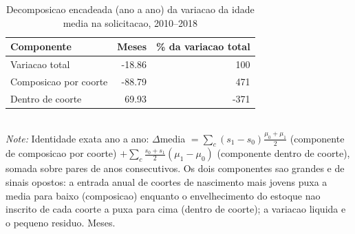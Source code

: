 \begin{table}[htbp]\centering
\caption{Decomposicao encadeada (ano a ano) da variacao da idade media na solicitacao, 2010--2018}
\label{tab:R3c_shiftshare}
\small
\begin{tabular}{lrr}
\toprule
Componente & Meses & \% da variacao total \\
\midrule
Variacao total & -18.86 & 100 \\
\midrule
Composicao por coorte & -88.79 & 471 \\
Dentro de coorte & 69.93 & -371 \\
\bottomrule
\end{tabular}
\\[3pt]{\footnotesize \textit{Note:} Identidade exata ano a ano: $\Delta$media $= \sum_c (s_1-s_0)\frac{\mu_0+\mu_1}{2}$ (componente de composicao por coorte) $+ \sum_c \frac{s_0+s_1}{2}(\mu_1-\mu_0)$ (componente dentro de coorte), somada sobre pares de anos consecutivos. Os dois componentes sao grandes e de sinais opostos: a entrada anual de coortes de nascimento mais jovens puxa a media para baixo (composicao) enquanto o envelhecimento do estoque nao inscrito de cada coorte a puxa para cima (dentro de coorte); a variacao liquida e o pequeno residuo. Meses.}
\end{table}
